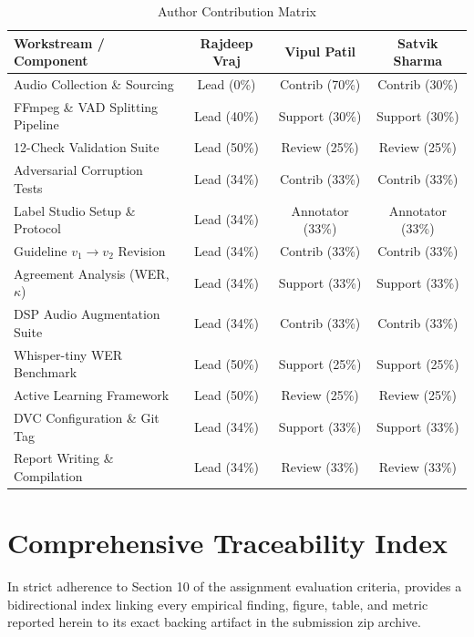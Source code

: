 \documentclass[10pt,a4paper,twocolumn]{article}
\renewcommand{\_}{\origunderscore\hspace{0pt}}
\begin{document}
\begin{table}[!t]
\centering
\small
\renewcommand{\arraystretch}{1.15}
\setlength{\tabcolsep}{6pt}
\caption{Author Contribution Matrix}
\label{tab:contribution}
\begin{tabularx}{\textwidth}{Y c c c}
\toprule
\textbf{Workstream / Component} & \textbf{Rajdeep Vraj} & \textbf{Vipul Patil} & \textbf{Satvik Sharma} \\
\midrule
Audio Collection \& Sourcing        & Lead (0\%)  & Contrib (70\%)   & Contrib (30\%) \\
FFmpeg \& VAD Splitting Pipeline    & Lead (40\%) & Support (30\%)   & Support (30\%) \\
12-Check Validation Suite           & Lead (50\%) & Review (25\%)    & Review (25\%) \\
Adversarial Corruption Tests        & Lead (34\%) & Contrib (33\%)   & Contrib (33\%) \\
Label Studio Setup \& Protocol      & Lead (34\%) & Annotator (33\%) & Annotator (33\%) \\
Guideline $v_1 \to v_2$ Revision    & Lead (34\%) & Contrib (33\%)   & Contrib (33\%) \\
Agreement Analysis (WER, $\kappa$)  & Lead (34\%) & Support (33\%)   & Support (33\%) \\
DSP Audio Augmentation Suite        & Lead (34\%) & Contrib (33\%)   & Contrib (33\%) \\
Whisper-tiny WER Benchmark          & Lead (50\%) & Support (25\%)   & Support (25\%) \\
Active Learning Framework           & Lead (50\%) & Review (25\%)    & Review (25\%) \\
DVC Configuration \& Git Tag        & Lead (34\%) & Support (33\%)   & Support (33\%) \\
Report Writing \& Compilation       & Lead (34\%) & Review (33\%)    & Review (33\%) \\
\bottomrule
\end{tabularx}
\end{table}

\onecolumn
\appendix

\section{Comprehensive Traceability Index}
In strict adherence to Section 10 of the assignment evaluation criteria,  provides a bidirectional index linking every empirical finding, figure, table, and metric reported herein to its exact backing artifact in the submission zip archive.
\end{document}
